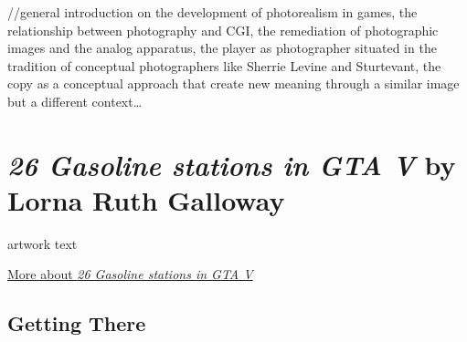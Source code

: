 \documentclass[
  openany]{book}
\begin{document}
//general introduction on the development of photorealism in games, the relationship between photography and CGI, the remediation of photographic images and the analog apparatus, the player as photographer situated in the tradition of conceptual photographers like Sherrie Levine and Sturtevant, the copy as a conceptual approach that create new meaning through a similar image but a different context\ldots{}

\hypertarget{gasoline-stations-in-gta-v-by-lorna-ruth-galloway}{%
\section*{\texorpdfstring{\emph{26 Gasoline stations in GTA V} by Lorna Ruth Galloway}{26 Gasoline stations in GTA V by Lorna Ruth Galloway}}\label{gasoline-stations-in-gta-v-by-lorna-ruth-galloway}}

artwork text

\href{https://www.lornaruthgalloway.com/charcoal-halftone}{More about \emph{26 Gasoline stations in GTA V}}

\hypertarget{getting-there-3}{%
\subsection*{Getting There}\label{getting-there-3}}
\end{document}
